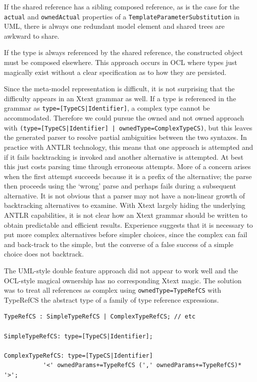\documentclass[runningheads,a4paper]{llncs}
\begin{document}
If the shared reference has a sibling composed reference, as is the case for the \verb+actual+ and  \verb+ownedActual+ properties of a \verb+TemplateParameterSubstitution+ in UML, there is always one redundant model element and shared trees are awkward to share.

If the type is always referenced by the shared reference, the constructed object must be composed elsewhere. This approach occurs in OCL where types just magically exist without a clear specification as to how they are persisted.

Since the meta-model representation is difficult, it is not surprising that the difficulty appears in an Xtext grammar as well. If a type is referenced in the grammar as \verb+type=[TypeCS|Identifier]+, a complex type cannot be accommodated. Therefore we could pursue the owned and not owned approach with \verb+(type=[TypeCS|Identifier] | ownedType=ComplexTypeCS)+, but this leaves the generated parser to resolve partial ambiguities between the two syntaxes. In practice with ANTLR technology, this means that one approach is attempted and if it fails backtracking is invoked and another alternative is attempted. At best this just costs parsing time through erroneous attempts. More of a concern arises when the first attempt succeeds because it is a prefix of the alternative; the parse then proceeds using the `wrong' parse and perhaps fails during a subsequent alternative. It is not obvious that a parser may not have a non-linear growth of backtracking alternatives to examine. With Xtext largely hiding the underlying ANTLR capabilities, it is not clear how an Xtext grammar should be written to obtain predictable and efficient results. Experience suggests that it is necessary to put more complex alternatives before simpler choices, since the complex can fail and back-track to the simple, but the converse of a false success of a simple choice does not backtrack.

The UML-style double feature approach did not appear to work well and the OCL-style magical ownership has no corresponding Xtext magic. The solution was to treat all references as complex using \verb+ownedType=TypeRefCS+ with TypeRefCS the abstract type of a family of type reference expressions.

{\small\begin{verbatim}
TypeRefCS : SimpleTypeRefCS | ComplexTypeRefCS; // etc

SimpleTypeRefCS: type=[TypeCS|Identifier];

ComplexTypeRefCS: type=[TypeCS|Identifier]
           '<' ownedParams+=TypeRefCS (',' ownedParams+=TypeRefCS)* '>';
\end{verbatim}}
\end{document}
